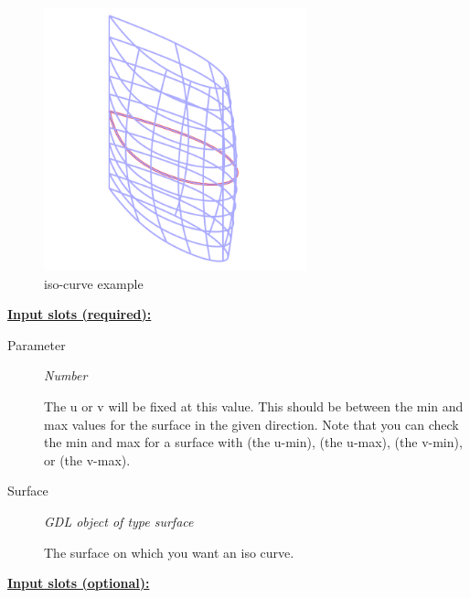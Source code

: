 \documentclass [11pt]{book}
\begin{document}
\begin{itemize}
\begin{figure}
\begin{center}
\includegraphics[width=3in,height=3in]{../images/example-iso-curve.pdf}
\end{center}

\caption{iso-curve example}

\label{fig:iso-curve}

\end{figure}





\textbf{
\underline{Input slots (required):}}

\begin{description}

\item [Parameter]
\emph{Number}

 The u or v will be fixed at this value.
This should be between the min and max values for the surface in the given direction. Note that
you can check the min and max for a surface with (the u-min), (the u-max), (the v-min), or (the v-max).




\item [Surface]
\emph{GDL object of type surface}

 The surface on which you want an iso curve.




\end{description}






\textbf{
\underline{Input slots (optional):}}

\begin{description}


\end{description}
\end{itemize}
\end{document}
